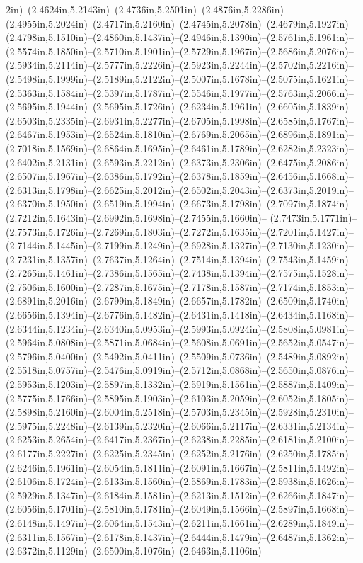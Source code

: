 2in)--(2.4624in,5.2143in)--(2.4736in,5.2501in)--(2.4876in,5.2286in)--(2.4955in,5.2024in)--(2.4717in,5.2160in)--(2.4745in,5.2078in)--(2.4679in,5.1927in)--(2.4798in,5.1510in)--(2.4860in,5.1437in)--(2.4946in,5.1390in)--(2.5761in,5.1961in)--(2.5574in,5.1850in)--(2.5710in,5.1901in)--(2.5729in,5.1967in)--(2.5686in,5.2076in)--(2.5934in,5.2114in)--(2.5777in,5.2226in)--(2.5923in,5.2244in)--(2.5702in,5.2216in)--(2.5498in,5.1999in)--(2.5189in,5.2122in)--(2.5007in,5.1678in)--(2.5075in,5.1621in)--(2.5363in,5.1584in)--(2.5397in,5.1787in)--(2.5546in,5.1977in)--(2.5763in,5.2066in)--(2.5695in,5.1944in)--(2.5695in,5.1726in)--(2.6234in,5.1961in)--(2.6605in,5.1839in)--(2.6503in,5.2335in)--(2.6931in,5.2277in)--(2.6705in,5.1998in)--(2.6585in,5.1767in)--(2.6467in,5.1953in)--(2.6524in,5.1810in)--(2.6769in,5.2065in)--(2.6896in,5.1891in)--(2.7018in,5.1569in)--(2.6864in,5.1695in)--(2.6461in,5.1789in)--(2.6282in,5.2323in)--(2.6402in,5.2131in)--(2.6593in,5.2212in)--(2.6373in,5.2306in)--(2.6475in,5.2086in)--(2.6507in,5.1967in)--(2.6386in,5.1792in)--(2.6378in,5.1859in)--(2.6456in,5.1668in)--(2.6313in,5.1798in)--(2.6625in,5.2012in)--(2.6502in,5.2043in)--(2.6373in,5.2019in)--(2.6370in,5.1950in)--(2.6519in,5.1994in)--(2.6673in,5.1798in)--(2.7097in,5.1874in)--(2.7212in,5.1643in)--(2.6992in,5.1698in)--(2.7455in,5.1660in)--
(2.7473in,5.1771in)--(2.7573in,5.1726in)--(2.7269in,5.1803in)--(2.7272in,5.1635in)--(2.7201in,5.1427in)--(2.7144in,5.1445in)--(2.7199in,5.1249in)--(2.6928in,5.1327in)--(2.7130in,5.1230in)--(2.7231in,5.1357in)--(2.7637in,5.1264in)--(2.7514in,5.1394in)--(2.7543in,5.1459in)--(2.7265in,5.1461in)--(2.7386in,5.1565in)--(2.7438in,5.1394in)--(2.7575in,5.1528in)--(2.7506in,5.1600in)--(2.7287in,5.1675in)--(2.7178in,5.1587in)--(2.7174in,5.1853in)--(2.6891in,5.2016in)--(2.6799in,5.1849in)--(2.6657in,5.1782in)--(2.6509in,5.1740in)--(2.6656in,5.1394in)--(2.6776in,5.1482in)--(2.6431in,5.1418in)--(2.6434in,5.1168in)--(2.6344in,5.1234in)--(2.6340in,5.0953in)--(2.5993in,5.0924in)--(2.5808in,5.0981in)--(2.5964in,5.0808in)--(2.5871in,5.0684in)--(2.5608in,5.0691in)--(2.5652in,5.0547in)--(2.5796in,5.0400in)--(2.5492in,5.0411in)--(2.5509in,5.0736in)--(2.5489in,5.0892in)--(2.5518in,5.0757in)--(2.5476in,5.0919in)--(2.5712in,5.0868in)--(2.5650in,5.0876in)--(2.5953in,5.1203in)--(2.5897in,5.1332in)--(2.5919in,5.1561in)--(2.5887in,5.1409in)--(2.5775in,5.1766in)--(2.5895in,5.1903in)--(2.6103in,5.2059in)--(2.6052in,5.1805in)--(2.5898in,5.2160in)--(2.6004in,5.2518in)--(2.5703in,5.2345in)--(2.5928in,5.2310in)--(2.5975in,5.2248in)--(2.6139in,5.2320in)--(2.6066in,5.2117in)--(2.6331in,5.2134in)--(2.6253in,5.2654in)--(2.6417in,5.2367in)--(2.6238in,5.2285in)--(2.6181in,5.2100in)--(2.6177in,5.2227in)--(2.6225in,5.2345in)--(2.6252in,5.2176in)--(2.6250in,5.1785in)--(2.6246in,5.1961in)--(2.6054in,5.1811in)--(2.6091in,5.1667in)--(2.5811in,5.1492in)--(2.6106in,5.1724in)--(2.6133in,5.1560in)--(2.5869in,5.1783in)--(2.5938in,5.1626in)--(2.5929in,5.1347in)--(2.6184in,5.1581in)--(2.6213in,5.1512in)--(2.6266in,5.1847in)--(2.6056in,5.1701in)--(2.5810in,5.1781in)--(2.6049in,5.1566in)--(2.5897in,5.1668in)--(2.6148in,5.1497in)--(2.6064in,5.1543in)--(2.6211in,5.1661in)--(2.6289in,5.1849in)--(2.6311in,5.1567in)--(2.6178in,5.1437in)--(2.6444in,5.1479in)--(2.6487in,5.1362in)--(2.6372in,5.1129in)--(2.6500in,5.1076in)--(2.6463in,5.1106in)
